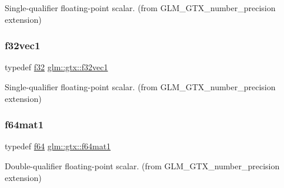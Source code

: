 Single-\/qualifier floating-\/point scalar. (from G\+L\+M\+\_\+\+G\+T\+X\+\_\+number\+\_\+precision extension) 

\mbox{\label{group__gtx__number__precision_gadab8e598b0b4697629482682bdb7f223}} 
\subsubsection{\texorpdfstring{f32vec1}{f32vec1}}
{\footnotesize\ttfamily typedef \mbox{\hyperlink{group__gtc__type__precision_ga0ec999b57f5330d9021256e96038df04}{f32}} \mbox{\hyperlink{group__gtx__number__precision_gadab8e598b0b4697629482682bdb7f223}{glm\+::gtx\+::f32vec1}}}



Single-\/qualifier floating-\/point scalar. (from G\+L\+M\+\_\+\+G\+T\+X\+\_\+number\+\_\+precision extension) 

\mbox{\label{group__gtx__number__precision_ga23f8f53c78b50aa07a113c3d07d01bc9}} 
\subsubsection{\texorpdfstring{f64mat1}{f64mat1}}
{\footnotesize\ttfamily typedef \mbox{\hyperlink{group__gtc__type__precision_ga2bba392e555124b36cde6abba349bab3}{f64}} \mbox{\hyperlink{group__gtx__number__precision_ga23f8f53c78b50aa07a113c3d07d01bc9}{glm\+::gtx\+::f64mat1}}}



Double-\/qualifier floating-\/point scalar. (from G\+L\+M\+\_\+\+G\+T\+X\+\_\+number\+\_\+precision extension) 

\mbox{\label{group__gtx__number__precision_ga710a5952d78b22635c71c5fc2c0a3319}} 
